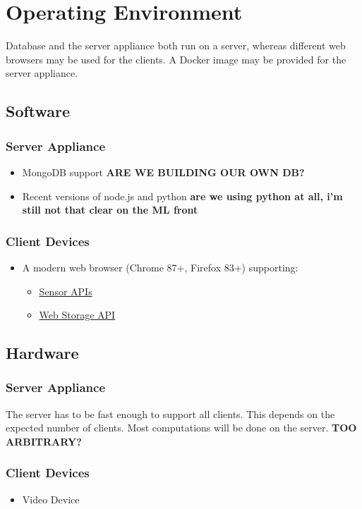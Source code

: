 \section{Operating Environment}
Database and the server appliance both run on a server, whereas different web browsers may be used for the clients. A Docker image may be provided for the server appliance.

\subsection{Software}
\subsubsection{Server Appliance}
\begin{itemize}
    \item MongoDB support \textbf{ARE WE BUILDING OUR OWN DB?}
    \item Recent versions of node.js and python \textbf{are we using python at all, i'm still not that clear on the ML front}
\end{itemize}
\subsubsection{Client Devices}
\begin{itemize}
    \item A modern web browser (Chrome 87+, Firefox 83+) supporting:
    \begin{itemize}
        \item \href{https://developer.mozilla.org/en-US/docs/Web/API/Sensor_APIs}{Sensor APIs}
        \item \href{https://developer.mozilla.org/en-US/docs/Web/API/Web_Storage_API}{Web Storage API}
    \end{itemize}
\end{itemize}

\subsection{Hardware} %
\subsubsection{Server Appliance}
    The server has to be fast enough to support all clients. This depends on the expected number of clients. Most computations will be done on the server. \textbf{TOO ARBITRARY?}
\subsubsection{Client Devices}
\begin{itemize}
    \item Video Device
\end{itemize}
